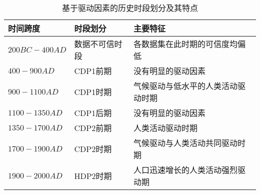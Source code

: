 \begin{table}[htbp]
    \centering
    \caption{基于驱动因素的历史时段划分及其特点}
      \begin{tabularx}{\textwidth}{LLL}
      \toprule
      时间跨度  & 时段划分  & 主要特征 \\
      \midrule
      $200BC-400AD$ & 数据不可信时段 & 各数据集在此时期的可信度均偏低 \\
      $400-900AD$ & CDP1前期 & 没有明显的驱动因素 \\
      $900-1100AD$ & CDP1时期 & 气候驱动与低水平的人类活动驱动时期 \\
      $1100-1350AD$ & CDP1后期 & 没有明显的驱动因素 \\
      $1350-1700AD$ & CDP2前期 & 人类活动驱动时期 \\
      $1700-1900AD$ & CDP2时期 & 气候驱动与人类活动共同驱动时期 \\
      $1900-2000AD$ & HDP2时期 & 人口迅速增长的人类活动强烈驱动期 \\
      \bottomrule
      \end{tabularx}%
    \label{tab:ch3:periods_division}%
\end{table}%
  